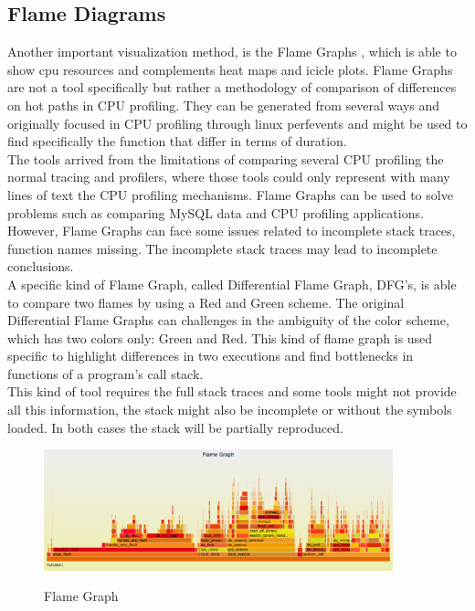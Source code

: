 \subsection{Flame Diagrams}
Another important visualization method, is the Flame Graphs \cite{brendan_flamegraph}, which is able to show cpu resources and complements heat maps and icicle plots. Flame Graphs are not a tool specifically but rather a methodology of comparison of differences on hot paths in CPU profiling. They can be generated from several ways and originally focused in CPU profiling through linux perf\textunderscore events and might be used to find specifically the function that differ in terms of duration.\\
The tools arrived from the limitations of comparing several CPU profiling the normal tracing and profilers, where those tools could only represent with many lines of text the CPU profiling mechanisms.
Flame Graphs can be used to solve problems such as comparing MySQL data and CPU profiling applications. However, Flame Graphs can face some issues related to incomplete stack traces, function names missing. The incomplete stack traces may lead to incomplete conclusions.\\
A specific kind of Flame Graph, called Differential Flame Graph, DFG’s, is able to compare two flames by using a Red and Green scheme. The original Differential Flame Graphs can challenges in the ambiguity of the color scheme, which has two colors only: Green and Red. This kind of flame graph is used specific to highlight differences in two executions and find bottlenecks in functions of a program's call stack. \\
This kind of tool requires the full stack traces and some tools might not provide all this information, the stack might also be incomplete or without the symbols loaded. In both cases the stack will be partially reproduced.
 
 \begin{figure}[h]
          \center
          \caption{Flame Graph}
            \includegraphics[width=0.90\textwidth]{figures/cpu-linux-execs.png}
            \label{fig:FlameGraph}
    \end{figure}
 
